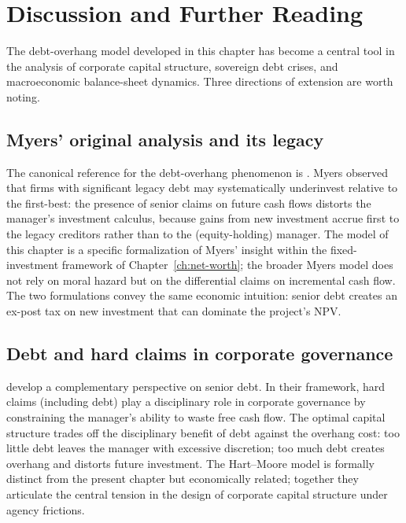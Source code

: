 \documentclass[11pt,a4paper,oneside]{book}
\theoremstyle{plain}
\theoremstyle{definition}
\theoremstyle{remark}
\numberwithin{equation}{chapter}
\begin{document}
\section{Discussion and Further Reading}
\label{sec:DO-discussion}

The debt-overhang model developed in this chapter has become a central tool in the analysis of corporate capital structure, sovereign debt crises, and macroeconomic balance-sheet dynamics.
Three directions of extension are worth noting.

\subsection{Myers' original analysis and its legacy}

The canonical reference for the debt-overhang phenomenon is \citet{Myers1977}.
Myers observed that firms with significant legacy debt may systematically underinvest relative to the first-best: the presence of senior claims on future cash flows distorts the manager's investment calculus, because gains from new investment accrue first to the legacy creditors rather than to the (equity-holding) manager.
The model of this chapter is a specific formalization of Myers' insight within the fixed-investment framework of Chapter~\ref{ch:net-worth}; the broader Myers model does not rely on moral hazard but on the differential claims on incremental cash flow.
The two formulations convey the same economic intuition: senior debt creates an ex-post tax on new investment that can dominate the project's NPV.

\subsection{Debt and hard claims in corporate governance}

\citet{HartMoore1995} develop a complementary perspective on senior debt.
In their framework, hard claims (including debt) play a disciplinary role in corporate governance by constraining the manager's ability to waste free cash flow.
The optimal capital structure trades off the disciplinary benefit of debt against the overhang cost: too little debt leaves the manager with excessive discretion; too much debt creates overhang and distorts future investment.
The Hart--Moore model is formally distinct from the present chapter but economically related; together they articulate the central tension in the design of corporate capital structure under agency frictions.
\end{document}
